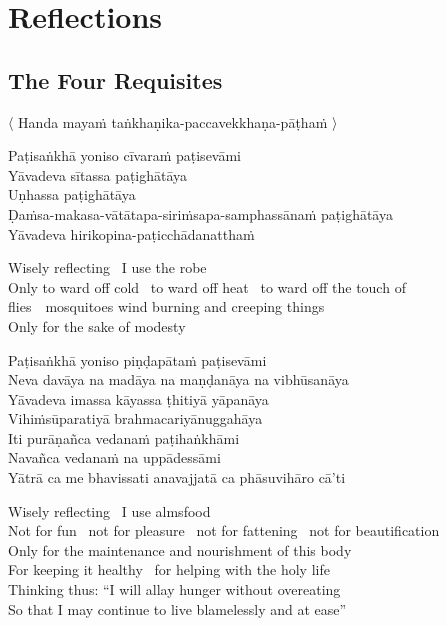 
\chapter{Reflections}

\section{The Four Requisites}
\label{four-requisites}

\begin{leader}
  〈 Handa mayaṁ taṅkhaṇika-paccavekkhaṇa-pāṭhaṁ 〉
\end{leader}

Paṭisaṅkhā yoniso cīvaraṁ paṭisevāmi\\
Yāvadeva sītassa paṭighātāya\\
Uṇhassa paṭighātāya\\
Ḍaṁsa-makasa-vātātapa-siriṁsapa-samphassānaṁ paṭighātāya\\
Yāvadeva hirikopina-paṭicchādanatthaṁ

\begin{english-verses}
  Wisely reflecting \breathmark\ I use the robe\\
  Only to ward off cold \breathmark\ to ward off heat \breathmark\ to ward off the touch of \mbox{flies}~\breathmark\ mosquitoes wind burning and creeping things\\
  Only for the sake of modesty
\end{english-verses}

Paṭisaṅkhā yoniso piṇḍapātaṁ paṭisevāmi\\
Neva davāya na madāya na maṇḍanāya na vibhūsanāya\\
Yāvadeva imassa kāyassa ṭhitiyā yāpanāya\\
Vihiṁsūparatiyā brahmacariyānuggahāya\\
Iti purāṇañca vedanaṁ paṭihaṅkhāmi\\
Navañca vedanaṁ na uppādessāmi\\
Yātrā ca me bhavissati anavajjatā ca phāsuvihāro cā'ti

\begin{english-verses}
  Wisely reflecting \breathmark\ I use almsfood\\
  Not for fun \breathmark\ not for pleasure \breathmark\ not for fattening \breathmark\ not for beautification\\
  Only for the maintenance and nourishment of this body\\
  For keeping it healthy \breathmark\ for helping with the holy life\\
  Thinking thus: ``I will allay hunger without overeating\\
  So that I may continue to live blamelessly and at ease''
\end{english-verses}

